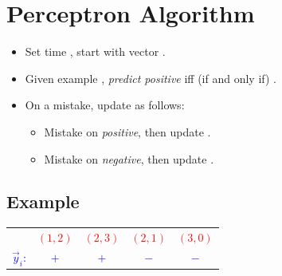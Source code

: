 \documentclass[
	number={2},
	title={Learning Linear Separators{,} SVMs and Kernels}
]{cs584notes}
\begin{document}
\section{Perceptron Algorithm}\label{sec:perceptron-algorithm}
\begin{itemize}
	\item Set time , start with vector .
	\item Given example , \emph{predict positive} iff (if and only if) .
	\item On a mistake, update as follows:
	\begin{itemize}
		\item Mistake on \emph{positive}, then update .
		\item Mistake on \emph{negative}, then update .
	\end{itemize}
\end{itemize}

\subsection{Example}\label{subsec:perceptron-examplee}
\begin{table}[H]
	\centering
	\begin{tabular}{c c c c c}
		\data{$\vec{x}_{i}$:} & \textcolor{red}{$(1, 2)$} & \textcolor{red}{$(2, 3)$} & \textcolor{red}{$(2, 1)$} & \textcolor{red}{$(3, 0)$}\\
		\textcolor{blue}{$\vec{y}_{i}$:} & \textcolor{blue}{$+$} & \textcolor{blue}{$+$} & \textcolor{blue}{$-$} & \textcolor{blue}{$-$}\\
	\end{tabular}
\end{table}
\end{document}
